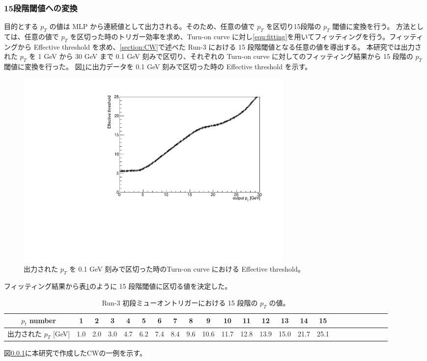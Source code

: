 \subsubsection{15段階閾値への変換}
目的とする $p_T$ の値は MLP から連続値として出力される。そのため、任意の値で $p_T$ を区切り15段階の $p_T$ 閾値に変換を行う。
方法としては、任意の値で $p_T$ を区切った時のトリガー効率を求め、Turn-on curve に対し\eqref{equ:fitting}を用いてフィッティングを行う。フィッティングから Effective threshold を求め、\ref{section:CW}で述べた Run-3 における 15 段階閾値となる任意の値を導出する。
本研究では出力された $p_T$ を 1 GeV から 30 GeV まで 0.1 GeV 刻みで区切り、それぞれの Turn-on curve に対してのフィッティング結果から 15 段階の $p_T$ 閾値に変換を行った。
図\ref{fig:Effictive_thr_v1}に出力データを 0.1 GeV 刻みで区切った時の Effective threshold を示す。
\begin{figure}[tb]
  \centering
  \includegraphics[clip, width=14cm]{fig/4/Effictive_thr_v1.pdf}
  \caption{出力された $p_T$ を 0.1 GeV 刻みで区切った時のTurn-on curve における Effective threshold。}
  \label{fig:Effictive_thr_v1}
\end{figure}
フィッティング結果から表\ref{Effective_number}のように 15 段階閾値に区切る値を決定した。
\begin{table}[thb]
\centering
    \caption{Run-3 初段ミューオントリガーにおける 15 段階の $p_T$ の値。}
    \label{Effective_number}
    
    \begin{tabular}{|c|c|c|c|c|c|c|c|c|c|c|c|c|c|c|c|c|c|c|c|c|c|c|c|}
        \hline
        $p_t$ number & 1 & 2 & 3 & 4 & 5 & 6 & 7 & 8 & 9 & 10 & 11 & 12 & 13 & 14 & 15\\
        \hline
        出力された $p_T$ [GeV] & 1.0 & 2.0 & 3.0 & 4.7 & 6.2 & 7.4 & 8.4 & 9.6 & 10.6 & 11.7 & 12.8 & 13.9 & 15.0 & 21.7 & 25.1\\
        \hline
    \end{tabular}
\end{table}

図\ref{}に本研究で作成したCWの一例を示す。




